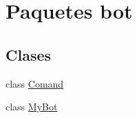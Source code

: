 \hypertarget{namespacebot}{}\section{Paquetes bot}
\label{namespacebot}
\subsection*{Clases}
\begin{DoxyCompactItemize}
\item 
class \mbox{\hyperlink{classbot_1_1_comand}{Comand}}
\item 
class \mbox{\hyperlink{classbot_1_1_my_bot}{My\+Bot}}
\end{DoxyCompactItemize}
